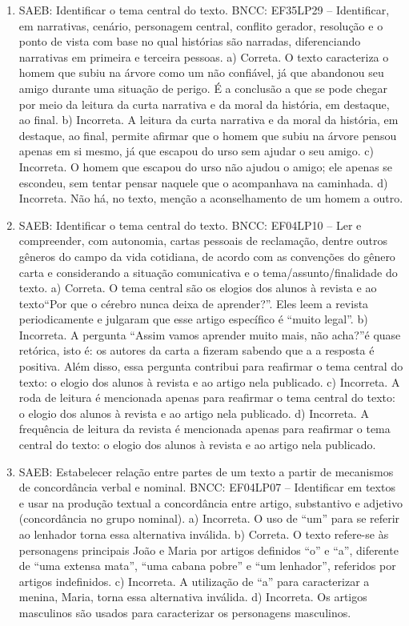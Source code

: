 \begin{enumerate}
\item
SAEB: Identificar o tema central do texto. BNCC: EF35LP29 -- Identificar, em narrativas, cenário, personagem central, conflito gerador, resolução e o ponto de vista com base no qual histórias são narradas, diferenciando narrativas em primeira e terceira pessoas. a) Correta. O texto caracteriza o homem que subiu na árvore como um não confiável, já que abandonou seu amigo durante uma situação de perigo. É a conclusão a que se pode chegar por meio da leitura da curta narrativa e da moral da história, em destaque, ao final. b) Incorreta. A leitura da curta narrativa e da moral da história, em destaque, ao final, permite afirmar que o homem que subiu na árvore pensou apenas em si mesmo, já que escapou do urso sem ajudar o seu amigo. c) Incorreta. O homem que escapou do urso não ajudou o amigo; ele apenas se escondeu, sem tentar pensar naquele que o acompanhava na caminhada. d) Incorreta. Não há, no texto, menção a aconselhamento de um homem a outro.

\item
SAEB: Identificar o tema central do texto. BNCC: EF04LP10 -- Ler e compreender, com autonomia, cartas pessoais de reclamação, dentre outros gêneros do campo da vida cotidiana, de acordo com as convenções do gênero carta e considerando a situação comunicativa e o tema/assunto/finalidade do texto. a) Correta. O tema central são os elogios dos alunos à revista e ao texto``Por que o cérebro nunca deixa de aprender?''. Eles leem a revista periodicamente e julgaram que esse artigo específico é ``muito legal''. b) Incorreta. A pergunta ``Assim vamos aprender muito mais, não acha?''é quase retórica, isto é: os autores da carta a fizeram sabendo que a a resposta é positiva. Além disso, essa pergunta contribui para reafirmar o tema central do texto: o elogio dos alunos à revista e ao artigo nela publicado. c) Incorreta. A roda de leitura é mencionada apenas para reafirmar o tema central do texto: o elogio dos alunos à revista e ao artigo nela publicado. d) Incorreta. A frequência de leitura da revista é mencionada apenas para reafirmar o tema central do texto: o elogio dos alunos à revista e ao artigo nela publicado.

\item
SAEB: Estabelecer relação entre partes de um texto a partir de mecanismos de concordância verbal e nominal. BNCC: EF04LP07 -- Identificar em textos e usar na produção textual a concordância entre artigo, substantivo e adjetivo (concordância no grupo nominal). a) Incorreta. O uso de ``um'' para se referir ao lenhador torna essa alternativa inválida. b) Correta. O texto refere-se às personagens principais João e Maria por artigos definidos ``o'' e ``a'', diferente de ``uma extensa mata'', ``uma cabana pobre'' e ``um lenhador'', referidos por artigos indefinidos. c) Incorreta. A utilização de ``a'' para caracterizar a menina, Maria, torna essa alternativa inválida. d) Incorreta. Os artigos masculinos são usados para caracterizar os personagens masculinos.


\end{enumerate}
